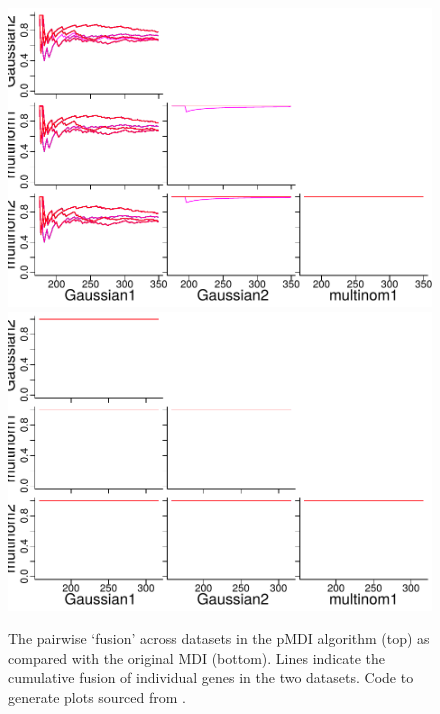 \documentclass[10pt,a4paper]{article}
\begin{document}
\begin{center}
\begin{figure}
\includegraphics{Plots/allocation_final.pdf}
\includegraphics{Plots/MDI_alloc.pdf}

\caption{The pairwise `fusion' across datasets in the pMDI algorithm (top) as compared with the original MDI (bottom). Lines indicate the cumulative fusion of individual genes in the two datasets. Code to generate plots sourced from \cite{mdipp}.
}
\label{fig:allocation}
\end{figure}
\end{center}
\end{document}
